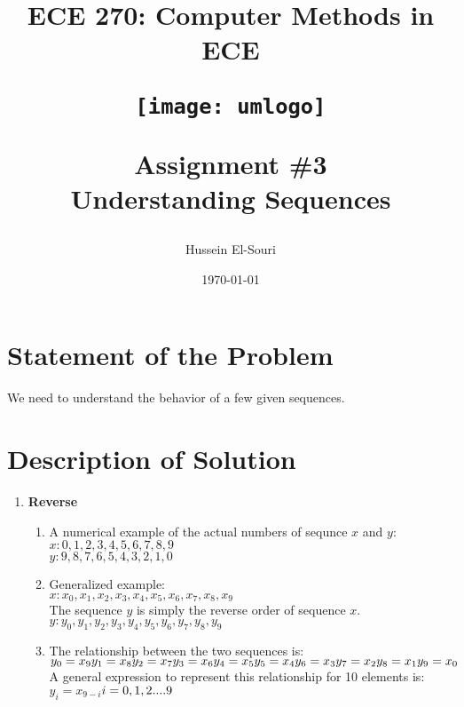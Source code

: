 \documentclass[letterpaper, 24pt, final, onecolumn, titlepage] {article}
\title{ECE 270: Computer Methods in ECE \\
	\vspace{1.5cm}
   		\begin{center}\texttt{[image: umlogo]} \end{center}
	\vspace{1.5cm}
	\textbf{Assignment \#3} \\
	Understanding Sequences}
\author{Hussein El-Souri}
\date{\today}
\begin{document}
\maketitle

\doublespacing

\section{Statement of the Problem}
We need to understand the behavior of a few given sequences.\\
\linebreak
\section{Description of Solution}
\begin {enumerate}
	\item \textbf{Reverse}
		\begin{enumerate}
			\item A numerical example of the actual numbers of sequnce $x$ and $y$:\\
				$x:0,1,2,3,4,5,6,7,8,9$\\
				$y:9,8,7,6,5,4,3,2,1,0$\\
			\item Generalized example:\\
				$x:x_0,x_1,x_2,x_3,x_4,x_5,x_6,x_7,x_8,x_9$\\
				The sequence $y$ is simply  the reverse order of sequence $x$.\\
				$y:y_0,y_1,y_2,y_3,y_4,y_5,y_6,y_7,y_8,y_9$\\
			\item The relationship between the two sequences is:\\
				$y_0=x_9\\
				 y_1=x_8\\
				 y_2=x_7\\
			 	y_3=x_6\\
				 y_4=x_5\\
				 y_5=x_4\\
				 y_6=x_3\\
				 y_7=x_2\\
			 	y_8=x_1\\
				 y_9=x_0$\\
				 A general expression to represent this relationship for 10 elements is:\\
				 $y_i=x_{9-i}$\hspace{10mm}$i=0,1,2....9\\$

\end{enumerate}
\end{enumerate}
\end{document}
